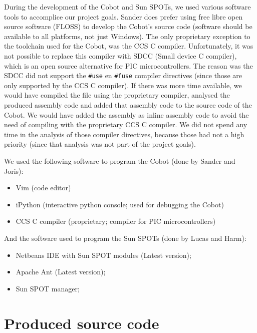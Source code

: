 \documentclass[a4paper,10pt]{article} %
\begin{document}
During the development of the Cobot and Sun SPOTs, we used various software
tools to accomplice our project goals. Sander does prefer using free libre open
source software (FLOSS) to develop the Cobot's source code (software should be
available to all platforms, not just Windows). The only proprietary exception to
the toolchain used for the Cobot, was the CCS C compiler. Unfortunately, it was
not possible to replace this compiler with SDCC (Small device C compiler), which
is an open source alternative for PIC microcontrollers. The reason was the SDCC
did not support the \texttt{\#use} en \texttt{\#fuse} compiler directives (since
those are only supported by the CCS C compiler). If there was more time
available, we would have compiled the file using the proprietary compiler,
analysed the produced assembly code and added that assembly code to the source
code of the Cobot. We would have added the assembly as inline assembly code to
avoid the need of compiling with the proprietary CCS C compiler. We did not
spend any time in the analysis of those compiler directives, because those had
not a high priority (since that analysis was not part of the project goals).

\noindent We used the following software to program the Cobot (done by Sander
and Joris):

\begin{itemize}
    \item Vim (code editor)
    \item iPython (interactive python console; used for debugging the Cobot)
    \item CCS C compiler (proprietary; compiler for PIC microcontrollers)
\end{itemize}

\noindent And the software used to program the Sun SPOTs (done by Lucas and
Harm):

\begin{itemize}
    \item Netbeans IDE with Sun SPOT modules (Latest version);
    \item Apache Ant (Latest version);
    \item Sun SPOT manager;
\end{itemize}


\section{Produced source code} %
\label{sec:Produced source code}
\end{document}
